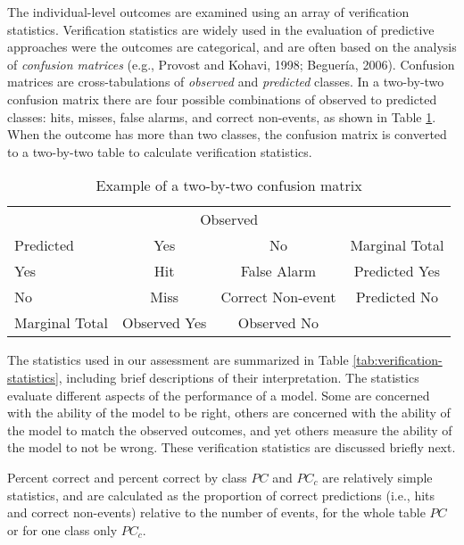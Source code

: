 \documentclass[]{elsarticle} %
\begin{document}
The individual-level outcomes are examined using an array of
verification statistics. Verification statistics are widely used in the
evaluation of predictive approaches were the outcomes are categorical,
and are often based on the analysis of \emph{confusion matrices} (e.g.,
Provost and Kohavi, 1998; Beguería, 2006). Confusion matrices are
cross-tabulations of \emph{observed} and \emph{predicted} classes. In a
two-by-two confusion matrix there are four possible combinations of
observed to predicted classes: hits, misses, false alarms, and correct
non-events, as shown in Table \ref{tab:confusion-matrix}. When the
outcome has more than two classes, the confusion matrix is converted to
a two-by-two table to calculate verification statistics.

\begin{table}[!h]

\caption{\label{tab:example-confusion-matrix}\label{tab:confusion-matrix}Example of a two-by-two confusion matrix}
\centering
\fontsize{7}{9}\selectfont
\begin{tabular}[t]{lccc}
\toprule
\multicolumn{1}{c}{ } & \multicolumn{2}{c}{Observed} & \multicolumn{1}{c}{ } \\
\cmidrule(l{3pt}r{3pt}){2-3}
Predicted & Yes & No & Marginal Total\\
\midrule
\rowcolor{gray!6}  Yes & Hit & False Alarm & Predicted Yes\\
No & Miss & Correct Non-event & Predicted No\\
\rowcolor{gray!6}  Marginal Total & Observed Yes & Observed No & \\
\bottomrule
\end{tabular}
\end{table}

The statistics used in our assessment are summarized in Table
\ref{tab:verification-statistics}, including brief descriptions of their
interpretation. The statistics evaluate different aspects of the
performance of a model. Some are concerned with the ability of the model
to be right, others are concerned with the ability of the model to match
the observed outcomes, and yet others measure the ability of the model
to not be wrong. These verification statistics are discussed briefly
next.

Percent correct and percent correct by class \(PC\) and \(PC_c\) are
relatively simple statistics, and are calculated as the proportion of
correct predictions (i.e., hits and correct non-events) relative to the
number of events, for the whole table \(PC\) or for one class only
\(PC_c\).
\end{document}
